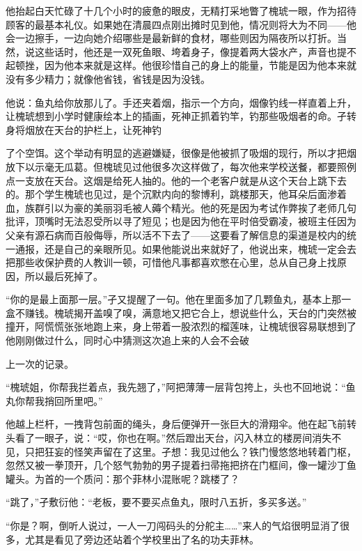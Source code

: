 \documentclass{article}
\begin{document}
他抬起白天忙碌了十几个小时的疲惫的眼皮，无精打采地瞥了槐琥一眼，作为招待顾客的最基本礼仪。如果她在清晨四点刚出摊时见到他，情况则将大为不同——他会一边擦手，一边向她介绍哪些是最新鲜的食材，哪些则因为隔夜所以打折。当然，说这些话时，他还是一双死鱼眼、垮着身子，像提着两大袋水产，声音也提不起顿挫，因为他本来就是这样。他很珍惜自己的身上的能量，节能是因为他本来就没有多少精力；就像他省钱，省钱是因为没钱。

他说：鱼丸给你放那儿了。手还夹着烟，指示一个方向，烟像钓线一样直着上升，让槐琥想到小学时健康绘本上的插画，死神正抓着钓竿，钓那些吸烟者的命。孑转身将烟放在天台的护栏上，让死神钓

\newpage 

了个空饵。这个举动有明显的逃避嫌疑，很像是他被抓了吸烟的现行，所以才把烟放下以示毫无瓜葛。但槐琥见过他很多次这样做了，每次他来学校送餐，都要照例点一支放在天台。这烟是给死人抽的。他的一个老客户就是从这个天台上跳下去的。那个学生槐琥也见过，是个沉默内向的黎博利，跳楼那天，他耳朵后面渗着血，族群引以为豪的美丽羽毛被人薅个精光。他的死是因为考试作弊挨了老师几句批评，顶嘴时无法忍受所以寻了短见；也是因为他在平时倍受霸凌，被班主任因为父亲有源石病而百般侮辱，所以活不下去了——这要看了解信息的渠道是校内的统一通报，还是自己的亲眼所见。如果他能说出来就好了，他说出来，槐琥一定会去把那些收保护费的人教训一顿，可惜他凡事都喜欢憋在心里，总从自己身上找原因，所以最后死掉了。

“你的是最上面那一层。”孑又提醒了一句。他在里面多加了几颗鱼丸，基本上那一盒不赚钱。槐琥揭开盖嗅了嗅，满意地又把它合上，想说些什么，天台的门突然被撞开，阿慌慌张张地跑上来，身上带着一股浓烈的榴莲味，让槐琥很容易联想到了他刚刚做过什么，同时心中猜测这次追上来的人会不会破

\newpage 

上一次的记录。

“槐琥姐，你帮我拦着点，我先翘了，”阿把薄薄一层背包挎上，头也不回地说：“鱼丸你帮我捎回所里吧。”

他越上栏杆，一拽背包前面的绳头，身后便弹开一张巨大的滑翔伞。他在起飞前转头看了一眼孑，说：“哎，你也在啊。”然后蹬出天台，闪入林立的楼房间消失不见，只把狂妄的怪笑声留在了这里。孑想：我见过他么？铁门慢悠悠地转着门枢，忽然又被一拳顶开，几个怒气勃勃的男子提着扫帚拖把挤在门框间，像一罐沙丁鱼罐头。为首的一个质问：那个菲林小混账呢？跳楼了？

“跳了，”孑敷衍他：“老板，要不要买点鱼丸，限时八五折，多买多送。”

“你是？啊，倒听人说过，一人一刀闯码头的分舵主……”来人的气焰很明显消了很多，尤其是看见了旁边还站着个学校里出了名的功夫菲林。
\end{document}
